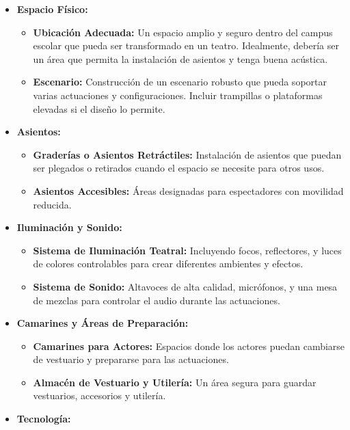 \begin{itemize}
    \item \textbf{Espacio Físico:}
            \begin{itemize}
                \item \textbf{Ubicación Adecuada:} Un espacio amplio y seguro dentro del campus escolar que pueda ser transformado en un teatro. Idealmente, debería ser un área que permita la instalación de asientos y tenga buena acústica.
                \item \textbf{Escenario:} Construcción de un escenario robusto que pueda soportar varias actuaciones y configuraciones. Incluir trampillas o plataformas elevadas si el diseño lo permite.
            \end{itemize}
    \item \textbf{Asientos:}
            \begin{itemize}
                \item \textbf{Graderías o Asientos Retráctiles:} Instalación de asientos que puedan ser plegados o retirados cuando el espacio se necesite para otros usos.
                \item \textbf{Asientos Accesibles:} Áreas designadas para espectadores con movilidad reducida.
            \end{itemize}
    \item \textbf{Iluminación y Sonido:}
            \begin{itemize}
                \item \textbf{Sistema de Iluminación Teatral:} Incluyendo focos, reflectores, y luces de colores controlables para crear diferentes ambientes y efectos.
                \item \textbf{Sistema de Sonido:} Altavoces de alta calidad, micrófonos, y una mesa de mezclas para controlar el audio durante las actuaciones.
            \end{itemize}
    \item \textbf{Camarines y Áreas de Preparación:}
            \begin{itemize}
                \item \textbf{Camarines para Actores:} Espacios donde los actores puedan cambiarse de vestuario y prepararse para las actuaciones.
                \item \textbf{Almacén de Vestuario y Utilería:} Un área segura para guardar vestuarios, accesorios y utilería.
            \end{itemize}
    \item \textbf{Tecnología:}

\end{itemize}
